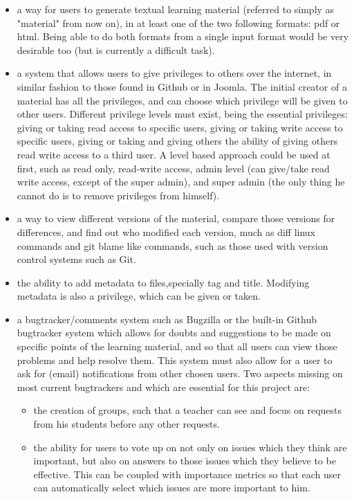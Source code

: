 \documentclass[12pt]{article}
\begin{document}
\begin{itemize}
  \item a way for users to generate textual learning material (referred to simply as "material" from now on), in at least one of the two following formats: pdf or html. Being able to do both formats from a single input format would be very desirable too (but is currently a difficult task).
  \item a system that allows users to give privileges to others over the internet, in similar fashion to those found in Github or in Joomla. The initial creator of a material has all the privileges, and can choose which privilege will be given to other users. Different privilege levels must exist, being the essential privileges: giving or taking read access to specific users, giving or taking write access to specific users, giving or taking and giving others the ability of giving others read write access to a third user. A level based approach could be used at first, such as read only, read-write access, admin level (can give/take read write access, except of the super admin), and super admin (the only thing he cannot do is to remove privileges from himself).
  \item a way to view different versions of the material, compare those versions for differences, and find out who modified each version, much as diff linux commands and git blame like commands, such as those used with version control systems such as Git.
  \item the ability to add metadata to files,specially tag and title. Modifying metadata is also a privilege, which can be given or taken.
  \item a bugtracker/comments system such as Bugzilla or the built-in Github bugtracker system which allows for doubts and suggestions to be made on specific points of the learning material, and so that all users can view those problems and help resolve them. This system must also allow for a user to ask for (email) notifications from other chosen users. Two aspects missing on most current bugtrackers and which are essential for this project are:
  \begin{itemize}
    \item the creation of groups, such that a teacher can see and focus on requests from his students before any other requests.
    \item the ability for users to vote up on not only on issues which they think are important, but also on answers to those issues which they believe to be effective. This can be coupled with importance metrics so that each user can automatically select which issues are more important to him.
  \end{itemize}
\end{itemize}
\end{document}
